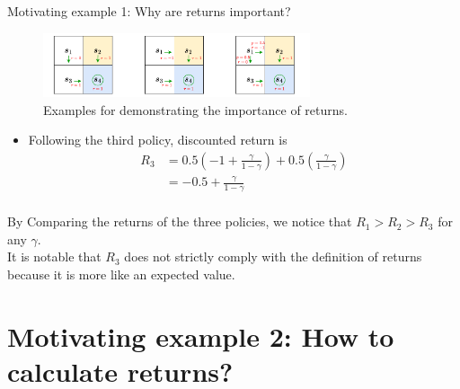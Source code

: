 \documentclass[aspectratio=169,xcolor=dvipsnames]{beamer}
\begin{document}
\begin{frame}{Motivating example 1: Why are returns important?}
    
\begin{figure}
	\centering
	\includegraphics[width=0.7\textwidth]{../imgs/chap2/ex_importance_returns.pdf}
	\caption{Examples for demonstrating the importance of returns.}
\end{figure}

\begin{itemize}
	\item Following the third policy, discounted return is
	\begin{equation*}
		\begin{aligned}
			R_3
			&= 0.5 \left(-1 + \frac{\gamma}{1 - \gamma}  \right) + 0.5 \left(\frac{\gamma}{1 - \gamma} \right) \\
			&= -0.5 + \frac{\gamma}{1 - \gamma} \\
		\end{aligned}
	\end{equation*}
\end{itemize}

By Comparing the returns of the three policies, we notice that $R_1 > R_2 > R_3$ for any $\gamma$. \\
It is notable that $R_3$ does not strictly comply with the definition of returns because it is more like an expected value.

\end{frame}

\section{Motivating example 2: How to calculate returns?}
\end{document}
